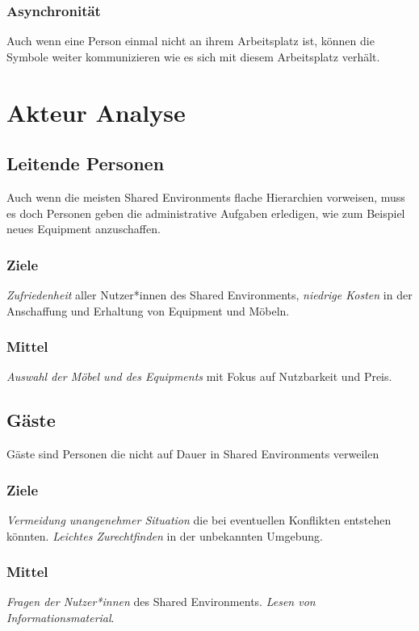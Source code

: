 \documentclass{article}
\begin{document}
\subsubsection*{Asynchronität}
Auch wenn eine Person einmal nicht an ihrem Arbeitsplatz ist, können die Symbole weiter kommunizieren wie es sich mit diesem Arbeitsplatz verhält.

\section{Akteur Analyse}


\subsection{Leitende Personen}

Auch wenn die meisten Shared Environments flache Hierarchien vorweisen, muss es doch Personen geben die administrative Aufgaben erledigen, wie zum Beispiel neues Equipment anzuschaffen.

\subsubsection*{Ziele}

\emph{Zufriedenheit} aller Nutzer*innen des Shared Environments, \emph{niedrige Kosten} in der Anschaffung und Erhaltung von Equipment und Möbeln.

\subsubsection*{Mittel}

\emph{Auswahl der Möbel und des Equipments} mit Fokus auf Nutzbarkeit und Preis. 

\subsection{Gäste}

Gäste sind Personen die nicht auf Dauer in Shared Environments verweilen

\subsubsection*{Ziele}
\emph{Vermeidung unangenehmer Situation} die bei eventuellen Konflikten entstehen könnten. \emph{Leichtes Zurechtfinden} in der unbekannten Umgebung. 

\subsubsection*{Mittel}
\emph{Fragen der Nutzer*innen} des Shared Environments. \emph{Lesen von Informationsmaterial}.  
\end{document}
